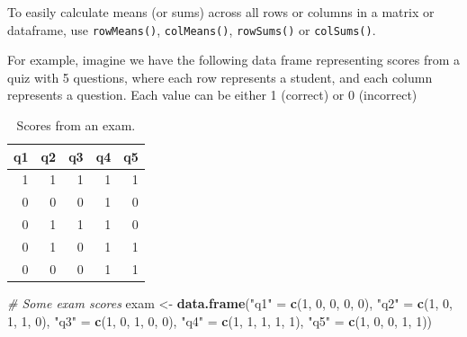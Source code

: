 \documentclass[]{book}
\newenvironment{Shaded}{\begin{snugshade}}{\end{snugshade}}
\newcommand{\KeywordTok}[1]{\textcolor[rgb]{0.13,0.29,0.53}{\textbf{{#1}}}}
\newcommand{\DecValTok}[1]{\textcolor[rgb]{0.00,0.00,0.81}{{#1}}}
\newcommand{\StringTok}[1]{\textcolor[rgb]{0.31,0.60,0.02}{{#1}}}
\newcommand{\CommentTok}[1]{\textcolor[rgb]{0.56,0.35,0.01}{\textit{{#1}}}}
\newcommand{\NormalTok}[1]{{#1}}
\theoremstyle{definition}
\theoremstyle{definition}
\theoremstyle{remark}
\begin{document}
To easily calculate means (or sums) across all rows or columns in a
matrix or dataframe, use \texttt{rowMeans()}, \texttt{colMeans()},
\texttt{rowSums()} or \texttt{colSums()}.

For example, imagine we have the following data frame representing
scores from a quiz with 5 questions, where each row represents a
student, and each column represents a question. Each value can be either
1 (correct) or 0 (incorrect)

\begin{table}

\caption{\label{tab:unnamed-chunk-268}Scores from an exam.}
\centering
\begin{tabular}[t]{r|r|r|r|r}
\hline
q1 & q2 & q3 & q4 & q5\\
\hline
1 & 1 & 1 & 1 & 1\\
\hline
0 & 0 & 0 & 1 & 0\\
\hline
0 & 1 & 1 & 1 & 0\\
\hline
0 & 1 & 0 & 1 & 1\\
\hline
0 & 0 & 0 & 1 & 1\\
\hline
\end{tabular}
\end{table}

\begin{Shaded}
\begin{Highlighting}[]
\CommentTok{# Some exam scores}
\NormalTok{exam <-}\StringTok{ }\KeywordTok{data.frame}\NormalTok{(}\StringTok{"q1"} \NormalTok{=}\StringTok{ }\KeywordTok{c}\NormalTok{(}\DecValTok{1}\NormalTok{, }\DecValTok{0}\NormalTok{, }\DecValTok{0}\NormalTok{, }\DecValTok{0}\NormalTok{, }\DecValTok{0}\NormalTok{),}
                   \StringTok{"q2"} \NormalTok{=}\StringTok{ }\KeywordTok{c}\NormalTok{(}\DecValTok{1}\NormalTok{, }\DecValTok{0}\NormalTok{, }\DecValTok{1}\NormalTok{, }\DecValTok{1}\NormalTok{, }\DecValTok{0}\NormalTok{),}
                   \StringTok{"q3"} \NormalTok{=}\StringTok{ }\KeywordTok{c}\NormalTok{(}\DecValTok{1}\NormalTok{, }\DecValTok{0}\NormalTok{, }\DecValTok{1}\NormalTok{, }\DecValTok{0}\NormalTok{, }\DecValTok{0}\NormalTok{),}
                   \StringTok{"q4"} \NormalTok{=}\StringTok{ }\KeywordTok{c}\NormalTok{(}\DecValTok{1}\NormalTok{, }\DecValTok{1}\NormalTok{, }\DecValTok{1}\NormalTok{, }\DecValTok{1}\NormalTok{, }\DecValTok{1}\NormalTok{),}
                   \StringTok{"q5"} \NormalTok{=}\StringTok{ }\KeywordTok{c}\NormalTok{(}\DecValTok{1}\NormalTok{, }\DecValTok{0}\NormalTok{, }\DecValTok{0}\NormalTok{, }\DecValTok{1}\NormalTok{, }\DecValTok{1}\NormalTok{))}
\end{Highlighting}
\end{Shaded}
\end{document}
